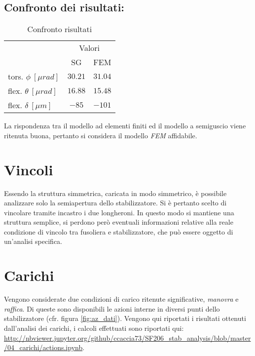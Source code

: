 \documentclass[
10pt, %
a4paper, %
oneside, %
headinclude,footinclude, %
BCOR5mm, %
]{scrartcl}
\begin{document}
\subsection{Confronto dei risultati:}

\begin{table}[hbt]
	\caption{Confronto risultati}
	\centering
	\begin{tabular}{lcc}
		\toprule
		& \multicolumn{2}{c}{Valori} \\
		\cmidrule(r){2-3}
		 & SG & FEM \\
		\midrule
		tors. $\phi \ [\mu rad]$ & $30.21$ & $31.04$ \\
		flex. $\theta \ [\mu rad]$ & $16.88$ & $15.48$ \\
		flex. $\delta \ [\mu m]$ & $-85$ & $-101$ \\
		\bottomrule
	\end{tabular}
	\label{tab:comp}
\end{table}

La rispondenza tra il modello ad elementi finiti ed il modello a semiguscio viene ritenuta buona, pertanto si considera il modello \emph{FEM} affidabile.


\section{Vincoli}
\label{sec:vincoli}

Essendo la struttura simmetrica, caricata in modo simmetrico, è possibile analizzare solo la semiapertura dello stabilizzatore. Si è pertanto scelto di vincolare tramite incastro i due longheroni. In questo modo si mantiene una struttura semplice, si perdono però eventuali informazioni relative alla reale condizione di vincolo tra fusoliera e stabilizzatore, che può essere oggetto di un'analisi specifica.


\section{Carichi}

Vengono considerate due condizioni di carico ritenute significative, \emph{manovra} e \emph{raffica}. Di queste sono disponibili le azioni interne in diversi punti dello stabilizzatore (cfr. figura \ref{fig:az_dati}). Vengono qui riportati i risultati ottenuti dall'analisi dei carichi, i calcoli effettuati sono riportati qui:\\ \url{http://nbviewer.jupyter.org/github/ccaccia73/SF206_stab_analysis/blob/master/04_carichi/actions.ipynb}.
\end{document}

